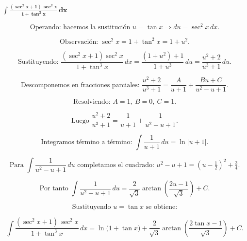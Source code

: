 $\displaystyle \mathbf{\int \frac{(\sec^{2}x + 1)\,\sec^{2}x}{1+\tan^{3}x}\,dx}$

\nopagebreak

\[
\text{Operando: hacemos la sustitución } u=\tan x \Rightarrow du=\sec^{2}x\,dx.
\]

\[
\text{Observación: } \sec^{2}x = 1+\tan^{2}x = 1+u^{2}.
\]

\[
\text{Sustituyendo: }
\frac{(\sec^{2}x+1)\sec^{2}x}{1+\tan^{3}x}\,dx
= \frac{(1+u^{2})+1}{1+u^{3}}\,du
= \frac{u^{2}+2}{u^{3}+1}\,du.
\]

\[
\text{Descomponemos en fracciones parciales: } 
\frac{u^{2}+2}{u^{3}+1} = \frac{A}{u+1} + \frac{Bu+C}{u^{2}-u+1}.
\]

\[
\text{Resolviendo: } A=1,\ B=0,\ C=1.
\]

\[
\text{Luego }
\frac{u^{2}+2}{u^{3}+1} = \frac{1}{u+1} + \frac{1}{u^{2}-u+1}.
\]

\[
\text{Integramos término a término: }
\int \frac{1}{u+1}\,du = \ln|u+1|.
\]

\[
\text{Para } \int \frac{1}{u^{2}-u+1}\,du
\text{ completamos el cuadrado: } u^{2}-u+1=(u-\tfrac{1}{2})^{2}+\tfrac{3}{4}.
\]

\[
\text{Por tanto }
\int \frac{1}{u^{2}-u+1}\,du
= \frac{2}{\sqrt{3}}\arctan\!\!\left(\frac{2u-1}{\sqrt{3}}\right) + C.
\]

\[
\text{Sustituyendo } u=\tan x \text{ se obtiene:}
\]

\[
\boxed{\displaystyle 
\int \frac{(\sec^{2}x + 1)\,\sec^{2}x}{1+\tan^{3}x}\,dx
= \ln\!\big(1+\tan x\big)
+ \frac{2}{\sqrt{3}}\arctan\!\!\left(\frac{2\tan x - 1}{\sqrt{3}}\right) + C.}
\]
